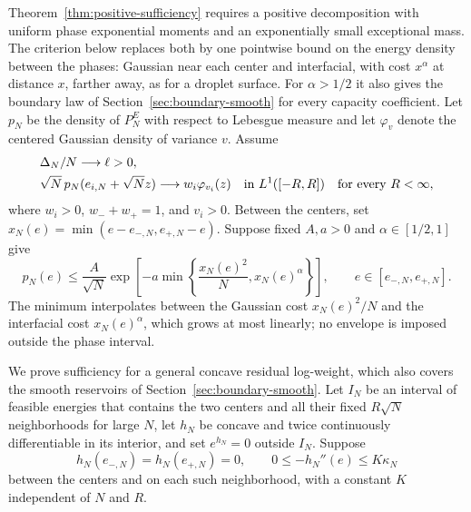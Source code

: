 Theorem~\ref{thm:positive-sufficiency} requires a positive
decomposition with uniform phase exponential moments and an
exponentially small exceptional mass. The criterion below replaces both
by one pointwise bound on the energy density between the phases:
Gaussian near each center and interfacial, with cost $x^\alpha$ at
distance $x$, farther away, as for a droplet surface. For $\alpha>1/2$
it also gives the boundary law of Section~\ref{sec:boundary-smooth}
for every capacity coefficient. Let $p_N$ be the density
of $P_N^E$ with respect to Lebesgue measure and let $\varphi_v$ denote the centered
Gaussian density of variance $v$. Assume
\begin{align}
 &\Delta_N/N\longrightarrow\ell>0,
 \label{eq:density-phase-gap}\\
 &\sqrt N\,p_N(e_{i,N}+\sqrt N z)
    \longrightarrow w_i\varphi_{v_i}(z)
    \quad\hbox{in }L^1([-R,R])\quad\hbox{for every }R<\infty,
 \label{eq:local-density-assumption}
\end{align}
where $w_i>0$, $w_-+w_+=1$, and $v_i>0$. Between the centers, set
$x_N(e)=\min(e-e_{-,N},e_{+,N}-e)$. Suppose fixed $A,a>0$ and
$\alpha\in[1/2,1]$ give
\begin{equation}
 p_N(e)\le\frac{A}{\sqrt N}
 \exp\left[-a\min\left\{\frac{x_N(e)^2}{N},x_N(e)^\alpha\right\}\right],
 \qquad e\in[e_{-,N},e_{+,N}].
 \label{eq:interior-density-envelope}
\end{equation}
The minimum interpolates between the Gaussian cost $x_N(e)^2/N$ and
the interfacial cost $x_N(e)^\alpha$, which grows at most linearly; no
envelope is imposed outside the phase interval.

We prove sufficiency for a general concave residual log-weight, which
also covers the smooth reservoirs of Section~\ref{sec:boundary-smooth}.
Let $I_N$ be an interval of feasible energies that contains the two
centers and all their fixed $R\sqrt N$ neighborhoods for large $N$,
let $h_N$ be concave and twice continuously differentiable in its
interior, and set $e^{h_N}=0$ outside $I_N$. Suppose
\begin{equation}
 h_N(e_{-,N})=h_N(e_{+,N})=0,\qquad
 0\le-h_N''(e)\le K\kappa_N
 \label{eq:concave-curvature-upper}
\end{equation}
between the centers and on each such neighborhood, with a constant
$K$ independent of $N$ and $R$.

